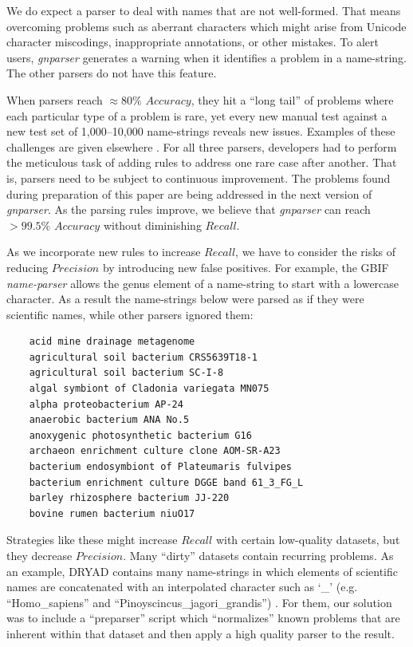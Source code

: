 \documentclass{bmcart}
\begin{document}
\vspace{0.5cm}

We do expect a parser to deal with names that are not well-formed. That means
overcoming problems such as aberrant characters which might arise from Unicode
character miscodings, inappropriate annotations, or other mistakes. To alert
users, \textit{gnparser} generates a warning when it identifies a problem in a
name-string. The other parsers do not have this feature.

When parsers reach $\approx80\%$ $Accuracy$, they hit a ``long tail'' of
problems where each particular type of a problem is rare, yet every new manual
test against a new test set of 1,000--10,000 name-strings reveals new issues.
Examples of these challenges are given elsewhere \cite{Patterson:inpress-a}.
For all three parsers, developers had to perform the meticulous task of adding
rules to address one rare case after another. That is, parsers need to be
subject to continuous improvement. The problems found during preparation of
this paper are being addressed in the next version of \textit{gnparser}. As the
parsing rules improve, we believe that \textit{gnparser} can reach $>99.5\%$
$Accuracy$ without diminishing $Recall$.

As we incorporate new rules to increase $Recall$, we have to consider the risks
of reducing $Precision$ by introducing new false positives. For example, the
GBIF \textit{name-parser} allows the genus element of a name-string to start
with a lowercase character. As a result the name-strings below were parsed as
if they were scientific names, while other parsers ignored them:

\vspace{0.5cm}

\begin{verbatim}
    acid mine drainage metagenome
    agricultural soil bacterium CRS5639T18-1
    agricultural soil bacterium SC-I-8
    algal symbiont of Cladonia variegata MN075
    alpha proteobacterium AP-24
    anaerobic bacterium ANA No.5
    anoxygenic photosynthetic bacterium G16
    archaeon enrichment culture clone AOM-SR-A23
    bacterium endosymbiont of Plateumaris fulvipes
    bacterium enrichment culture DGGE band 61_3_FG_L
    barley rhizosphere bacterium JJ-220
    bovine rumen bacterium niuO17
\end{verbatim}

\vspace{0.5cm}

Strategies like these might increase $Recall$ with certain low-quality
datasets, but they decrease $Precision$. Many ``dirty'' datasets contain
recurring problems. As an example, DRYAD contains many name-strings in which
elements of scientific names are concatenated with an interpolated character
such as `\_’ (e.g. ``Homo\_sapiens'' and ``Pinoyscincus\_jagori\_grandis'')
\cite{Patterson:inpress-a}. For them, our solution was to include a
``preparser'' script which ``normalizes'' known problems that are inherent
within that dataset and then apply a high quality parser to the result.
\end{document}
